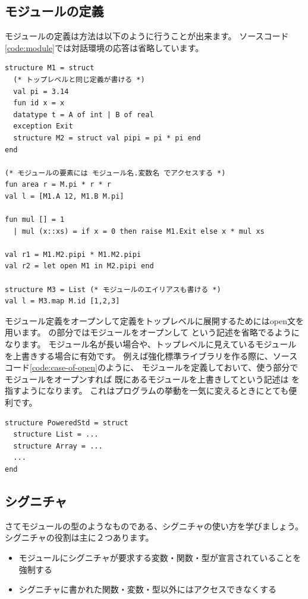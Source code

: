 \documentclass[11pt,a4paper]{article}
\begin{document}
\subsection{モジュールの定義}

モジュールの定義は方法は以下のように行うことが出来ます。
ソースコード\ref{code:module}では対話環境の応答は省略しています。

\begin{lstlisting}[caption=モジュールの定義,label=code:module]
structure M1 = struct
  (* トップレベルと同じ定義が書ける *)
  val pi = 3.14
  fun id x = x
  datatype t = A of int | B of real
  exception Exit
  structure M2 = struct val pipi = pi * pi end
end

(* モジュールの要素には モジュール名.変数名 でアクセスする *)
fun area r = M.pi * r * r
val l = [M1.A 12, M1.B M.pi]

fun mul [] = 1
  | mul (x::xs) = if x = 0 then raise M1.Exit else x * mul xs

val r1 = M1.M2.pipi * M1.M2.pipi
val r2 = let open M1 in M2.pipi end

structure M3 = List (* モジュールのエイリアスも書ける *)
val l = M3.map M.id [1,2,3]
\end{lstlisting}

モジュール定義をオープンして定義をトップレベルに展開するためにはopen文を用います。
の部分ではモジュールをオープンして
という記述を省略でるようになります。
モジュール名が長い場合や、トップレベルに見えているモジュールを上書きする場合に有効です。
例えば強化標準ライブラリを作る際に、ソースコード\ref{code:case-of-open}のように、
モジュールを定義しておいて、使う部分でモジュールをオープンすれば
既にあるモジュールを上書きしてという記述は
を指すようになります。
これはプログラムの挙動を一気に変えるときにとても便利です。

\begin{lstlisting}[caption=openの使いドコロ,label=code:case-of-open]
structure PoweredStd = struct
  structure List = ...
  structure Array = ...
  ...
end
\end{lstlisting}

\subsection{シグニチャ}

さてモジュールの型のようなものである、シグニチャの使い方を学びましょう。
シグニチャの役割は主に２つあります。
\begin{itemize}
\item モジュールにシグニチャが要求する変数・関数・型が宣言されていることを強制する
\item シグニチャに書かれた関数・変数・型以外にはアクセスできなくする
\end{itemize}
\end{document}
